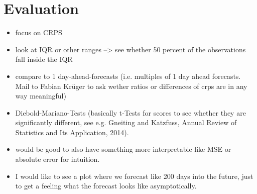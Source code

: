 
\chapter{Evaluation}
\begin{itemize}
\item focus on CRPS
\item look at IQR or other ranges --> see whether 50 percent of the observations fall inside the IQR
\item compare to 1 day-ahead-forecasts (i.e. multiples of 1 day ahead forecasts. Mail to Fabian Krüger to ask wether ratios or differences of crps are in any way meaningful)
\item Diebold-Mariano-Tests (basically t-Tests for scores to see whether they are significantly different, see e.g. Gneiting and Katzfuss, Annual Review of Statistics and Its Application, 2014).
\item would be good to also have something more interpretable like MSE or absolute error for intuition. 
\item I would like to see a plot where we forecast like 200 days into the future, just to get a feeling what the forecast looks like asymptotically. 
\end{itemize}

